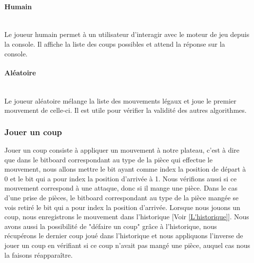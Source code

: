 \huge\documentclass{article}
\begin{document}
\paragraph{Humain}
~~\\
\newline
Le joueur humain permet à un utilisateur d'interagir avec le moteur de jeu depuis la console.
Il affiche la liste des coups possibles et attend la réponse sur la console.

\paragraph{Aléatoire}
~~\\
\newline
Le joueur aléatoire mélange la liste des mouvements légaux et joue le premier mouvement de celle-ci.
Il est utile pour vérifier la validité des autres algorithmes.

\subsubsection{Jouer un coup}\label{domove}
Jouer un coup consiste à appliquer un mouvement à notre plateau, c'est à dire que dans le bitboard correspondant au type de la pièce qui effectue le mouvement, nous allons mettre le bit ayant comme index la position de départ à 0 et le bit qui a pour index la position d'arrivée à 1.\newline 
Nous vérifions aussi si ce mouvement correspond à une attaque, donc si il mange une pièce.\newline
Dans le cas d'une prise de pièces, le bitboard correspondant au type de la pièce mangée se vois retiré le bit qui a pour index la position d'arrivée.\newline
Lorsque nous jouons un coup, nous enregistrons le mouvement dans l'historique [Voir \ref{L'historique}].\newline
Nous avons aussi la possibilité de "défaire un coup" grâce à l'historique, nous récupérons le dernier coup joué dans l'historique et nous appliquons l'inverse de jouer un coup en vérifiant si ce coup n'avait pas mangé une pièce, auquel cas nous la faisons réapparaître.
\end{document}
